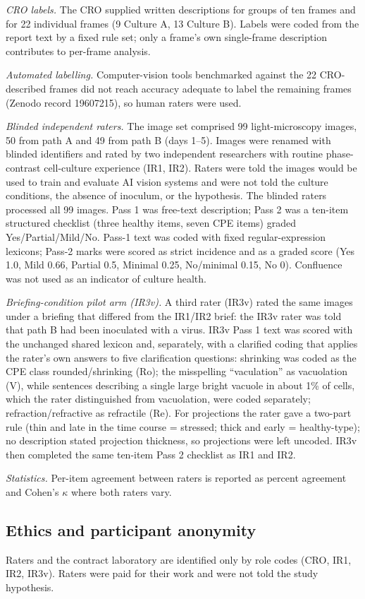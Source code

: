\emph{CRO labels.} The CRO supplied written descriptions for groups of ten frames and for 22 individual frames (9 Culture A, 13 Culture B). Labels were coded from the report text by a fixed rule set; only a frame's own single-frame description contributes to per-frame analysis.

\emph{Automated labelling.} Computer-vision tools benchmarked against the 22 CRO-described frames did not reach accuracy adequate to label the remaining frames (Zenodo record 19607215), so human raters were used.

\emph{Blinded independent raters.} The image set comprised 99 light-microscopy images, 50 from path A and 49 from path B (days 1--5). Images were renamed with blinded identifiers and rated by two independent researchers with routine phase-contrast cell-culture experience (IR1, IR2). Raters were told the images would be used to train and evaluate AI vision systems and were not told the culture conditions, the absence of inoculum, or the hypothesis. The blinded raters processed all 99 images. Pass 1 was free-text description; Pass 2 was a ten-item structured checklist (three healthy items, seven CPE items) graded Yes/Partial/Mild/No. Pass-1 text was coded with fixed regular-expression lexicons; Pass-2 marks were scored as strict incidence and as a graded score (Yes 1.0, Mild 0.66, Partial 0.5, Minimal 0.25, No/minimal 0.15, No 0). Confluence was not used as an indicator of culture health.

\emph{Briefing-condition pilot arm (IR3v).} A third rater (IR3v) rated the same images under a briefing that differed from the IR1/IR2 brief: the IR3v rater was told that path B had been inoculated with a virus. IR3v Pass 1 text was scored with the unchanged shared lexicon and, separately, with a clarified coding that applies the rater's own answers to five clarification questions: shrinking was coded as the CPE class rounded/shrinking (Ro); the misspelling ``vaculation'' as vacuolation (V), while sentences describing a single large bright vacuole in about 1\% of cells, which the rater distinguished from vacuolation, were coded separately; refraction/refractive as refractile (Re). For projections the rater gave a two-part rule (thin and late in the time course = stressed; thick and early = healthy-type); no description stated projection thickness, so projections were left uncoded. IR3v then completed the same ten-item Pass 2 checklist as IR1 and IR2.

\emph{Statistics.} Per-item agreement between raters is reported as percent agreement and Cohen's $\kappa$ where both raters vary. 

\subsection*{Ethics and participant anonymity}
Raters and the contract laboratory are identified only by role codes (CRO, IR1, IR2, IR3v). Raters were paid for their work and were not told the study hypothesis. 
